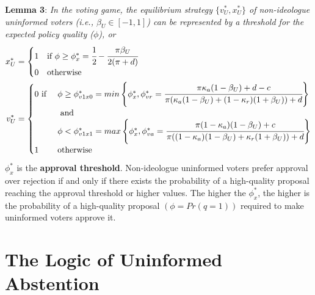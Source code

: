 \documentclass[letterpaper, 12pt]{article}
\begin{document}
    \noindent \textbf{Lemma 3}: \textit{In the voting game, the equilibrium strategy $\{v^*_U, x^*_U\}$ of non-ideologue uninformed voters (i.e., $\beta_U \in [-1, 1]$) can be represented by a threshold for the expected policy quality ($\phi$), or} 
    \begin{align}
    x^*_U &= 
    \begin{cases}
    1 & \text{if } \phi \geq \phi^*_x = \cfrac{1}{2} - \cfrac{\pi \beta_U}{2(\pi + d)}\\
    0 & \text{otherwise}
    \end{cases} \\
    v^*_U &= 
    \begin{cases}
    0 \text{ if } 
    &\phi \geq \phi^*_{v1x0} = min\left\{ \phi^*_x, \phi^*_{vr} = \cfrac{\pi \kappa_{a} (1-\beta_U) + d - c}{\pi (\kappa_{a} (1-\beta_U) + (1-\kappa_{r}) (1 + \beta_U))+ d} \right\} \\
    &\text{ and } \\ 
    &\phi < \phi^*_{v1x1} =max\left\{ \phi^*_x,  \phi^*_{va} = \cfrac{\pi (1 - \kappa_{a}) (1-\beta_U) + c}{\pi ((1-\kappa_{a}) (1-\beta_U) + \kappa_{r} (1 + \beta_U)) + d} \right\} \\
    1 &\text{otherwise}
    \end{cases} 
    \end{align}
    \noindent $\phi^*_x$ is the \textbf{approval threshold}. Non-ideologue uninformed voters prefer approval over rejection if and only if there exists the probability of a high-quality proposal reaching the approval threshold or higher values. The higher the $\phi^*_x$, the higher is the probability of a high-quality proposal $(\phi = Pr(q=1))$ required to make uninformed voters approve it. 
    
    \section*{The Logic of Uninformed Abstention}
    
\end{document}
